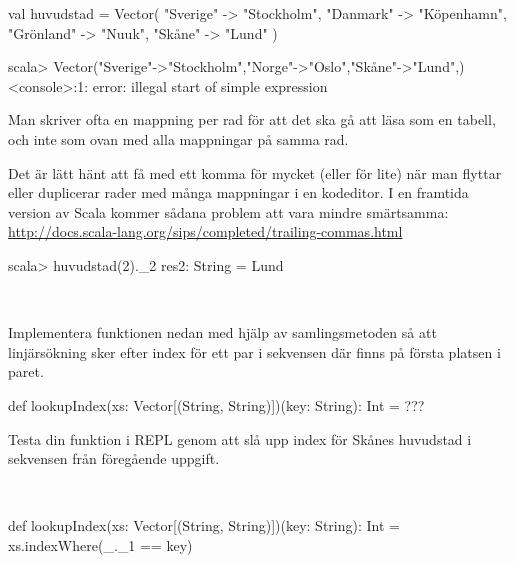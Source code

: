 \SubtaskSolved

\begin{Code}
val huvudstad = Vector(
  "Sverige"  -> "Stockholm",
  "Danmark"  -> "Köpenhamn",
  "Grönland" -> "Nuuk",
  "Skåne"    -> "Lund"
)
\end{Code}

\SubtaskSolved

\begin{REPL}
scala> Vector("Sverige"->"Stockholm","Norge"->"Oslo","Skåne"->"Lund",)
<console>:1: error: illegal start of simple expression
\end{REPL}
Man skriver ofta en mappning per rad för att det ska gå att läsa som en tabell, och inte som ovan med alla mappningar på samma rad.

Det är lätt hänt att få med ett komma för mycket (eller för lite) när man flyttar eller duplicerar rader med många mappningar i en kodeditor. I en framtida version av Scala kommer sådana problem att vara mindre smärtsamma:\\
\url{http://docs.scala-lang.org/sips/completed/trailing-commas.html}

\SubtaskSolved
\begin{REPL}
scala> huvudstad(2)._2
res2: String = Lund
\end{REPL}

\QUESTEND




\QUESTBEGIN

\Task \what~

\Subtask Implementera funktionen  nedan med hjälp av samlingsmetoden  så att linjärsökning sker efter index för ett par i sekvensen där  finns på första platsen i paret.

\begin{Code}
def lookupIndex(xs: Vector[(String, String)])(key: String): Int = ???
\end{Code}

\Subtask Testa din funktion i REPL genom att slå upp index för Skånes huvudstad i sekvensen  från föregående uppgift.

\SOLUTION

\TaskSolved \what~

\SubtaskSolved
\begin{Code}
def lookupIndex(xs: Vector[(String, String)])(key: String): Int =
  xs.indexWhere(_._1 == key)
\end{Code}

